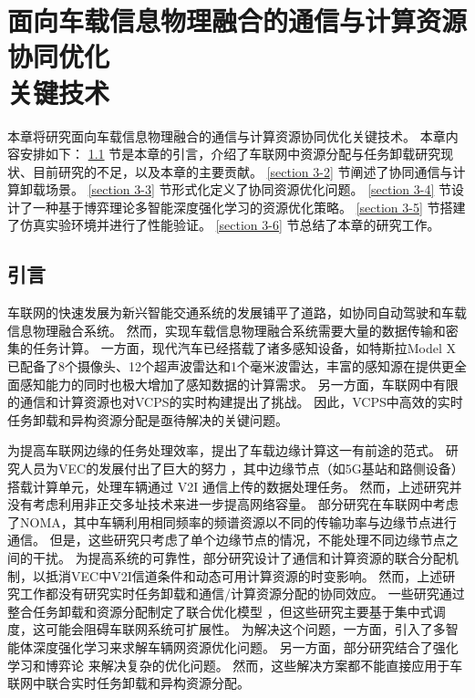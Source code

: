 \chapter[面向车载信息物理融合的通信与计算资源协同优化关键技术]{面向车载信息物理融合的通信与计算资源协同优化\\关键技术}
\removelofgap
\removelotgap
本章将研究面向车载信息物理融合的通信与计算资源协同优化关键技术。
本章内容安排如下：
\ref{section 3-1} 节是本章的引言，介绍了车联网中资源分配与任务卸载研究现状、目前研究的不足，以及本章的主要贡献。
\ref{section 3-2} 节阐述了协同通信与计算卸载场景。
\ref{section 3-3} 节形式化定义了协同资源优化问题。
\ref{section 3-4} 节设计了一种基于博弈理论多智能深度强化学习的资源优化策略。
\ref{section 3-5} 节搭建了仿真实验环境并进行了性能验证。
\ref{section 3-6} 节总结了本章的研究工作。

\section{引言}\label{section 3-1}

车联网的快速发展为新兴智能交通系统的发展铺平了道路，如协同自动驾驶\cite{bagheri20215g}和车载信息物理融合系统\cite{mugabarigira2023context}。
然而，实现车载信息物理融合系统需要大量的数据传输和密集的任务计算。
一方面，现代汽车已经搭载了诸多感知设备，如特斯拉Model X已配备了8个摄像头、12个超声波雷达和1个毫米波雷达，丰富的感知源在提供更全面感知能力的同时也极大增加了感知数据的计算需求。
另一方面，车联网中有限的通信和计算资源也对VCPS的实时构建提出了挑战。
因此，VCPS中高效的实时任务卸载和异构资源分配是亟待解决的关键问题。

为提高车联网边缘的任务处理效率，提出了车载边缘计算\cite{lang2022cooperative}这一有前途的范式。
研究人员为VEC的发展付出了巨大的努力 \cite{liu2021fog, dai2021edge, zhang2022digital, liu2020adaptive, liu2018coding}，其中边缘节点（如5G基站和路侧设备）搭载计算单元，处理车辆通过 V2I 通信上传的数据处理任务。
然而，上述研究并没有考虑利用非正交多址\cite{islam2017power}技术来进一步提高网络容量。
部分研究在车联网中考虑了NOMA\cite{patel2021performance, zhang2021centralized, zhu2021decentralized, liu2019energy}，其中车辆利用相同频率的频谱资源以不同的传输功率与边缘节点进行通信。
但是，这些研究只考虑了单个边缘节点的情况，不能处理不同边缘节点之间的干扰。
为提高系统的可靠性，部分研究设计了通信和计算资源的联合分配机制，以抵消VEC中V2I信道条件和动态可用计算资源的时变影响\cite{liu2021rtds, liu2022a, chen2020robust, liu2014temporal, liu2016cooperative}。
然而，上述研究工作都没有研究实时任务卸载和通信/计算资源分配的协同效应。
一些研究通过整合任务卸载和资源分配制定了联合优化模型 \cite{dai2021asynchronous, dai2022a}，但这些研究主要基于集中式调度，这可能会阻碍车联网系统可扩展性。
为解决这个问题，一方面，引入了多智能体深度强化学习\cite{kumar2022multi}来求解车辆网资源优化问题\cite{alam2022multi, zhang2021adaptive, nie2021semi}。
另一方面，部分研究结合了强化学习和博弈论 \cite{zheng2022stackelberg, albaba2021driver, rajeswaran2020a}来解决复杂的优化问题。
然而，这些解决方案都不能直接应用于车联网中联合实时任务卸载和异构资源分配。

